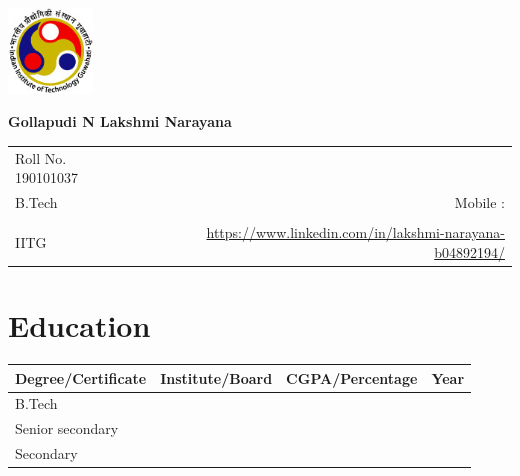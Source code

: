 \documentclass[a4paper,10pt]{report}
\begin{document}
\vspace{-0.1000pt}


\parbox{2.3cm}{

\includegraphics[width=2.25cm,clip]{iitg_logo.jpg}

}
\parbox{\dimexpr\linewidth-2.3cm\relax}{

\textbf{\huge Gollapudi N Lakshmi Narayana}\\
\begin{tabular*}{\textwidth}{l@{\hskip 1.25cm}r}


{Roll No. 190101037}&\href{mailto:}{ }\\
{B.Tech}& Mobile : \\
{}&\href{mailto:}{ }\\
{IITG} & \href{https://www.linkedin.com/in/lakshmi-narayana-b04892194//}{https://www.linkedin.com/in/lakshmi-narayana-b04892194/}

\end{tabular*}
}


\vspace{5pt}


\section{Education}
\centering
 \begin{tabu} to 1\textwidth { | X[c] | X[c] | X[c] | X[c]| }
 \hline   \textbf{Degree/Certificate} & \textbf{Institute/Board} & \textbf{CGPA/Percentage} & \textbf{Year} \\
 
\hline B.Tech& & & \\
\hline Senior secondary& & & \\
\hline Secondary& & & \\

\hline
\end{tabu}
\end{document}
